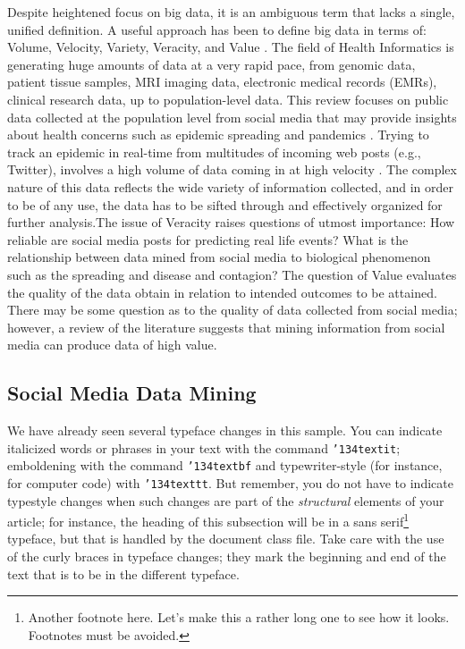 \documentclass[sigconf]{acmart}
\begin{document}
Despite heightened focus on big data, it is an ambiguous term that lacks a single, unified definition. A useful approach has been to define big data in terms of: Volume, Velocity, Variety, Veracity, and Value \cite{demchenko12}. The field of Health Informatics is generating huge amounts of data at a very rapid pace, from genomic data, patient tissue samples, MRI imaging data, electronic medical records (EMRs), clinical research data, up to population-level data. This review focuses on public data collected at the population level from social media that may provide insights about health concerns such as epidemic spreading and pandemics  \cite{hay13, herland14}. Trying to track an epidemic in real-time from multitudes of incoming web posts (e.g., Twitter), involves a high volume of data coming in at high velocity \cite{lamb13, paul14}. The complex nature of this data reflects the wide variety of information collected, and in order to be of any use, the data has to be sifted through and effectively organized for further analysis.The issue of Veracity raises questions of utmost importance: How reliable are social media posts for predicting real life events? What is the relationship between data mined from social media to biological phenomenon such as the spreading and disease and contagion? The question of Value evaluates the quality of the data obtain in relation to intended outcomes to be attained. There may be some question as to the quality of data collected from social media; however, a review of the literature suggests that mining information from social media can produce data of high value.  

\subsection{Social Media Data Mining}

We have already seen several typeface changes in this sample.  You can
indicate italicized words or phrases in your text with the command
\texttt{{\char'134}textit}; emboldening with the command
\texttt{{\char'134}textbf} and typewriter-style (for instance, for
computer code) with \texttt{{\char'134}texttt}.  But remember, you do
not have to indicate typestyle changes when such changes are part of
the \textit{structural} elements of your article; for instance, the
heading of this subsection will be in a sans serif\footnote{Another
  footnote here.  Let's make this a rather long one to see how it
  looks. Footnotes must be avoided.} typeface, but that is handled by
the document class file.  Take care with the use of the curly braces
in typeface changes; they mark the beginning and end of the text that
is to be in the different typeface.
\end{document}
